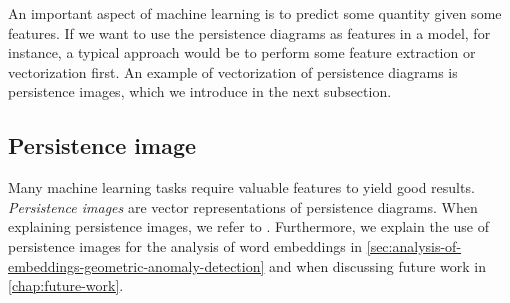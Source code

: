An important aspect of machine learning is to predict some quantity given some features. If we want to use the persistence diagrams as features in a model, for instance, a typical approach would be to perform some feature extraction or vectorization first. An example of vectorization of persistence diagrams is persistence images, which we introduce in the next subsection.

\subsection{Persistence image}
\label{sec:persistence-image}
Many machine learning tasks require valuable features to yield good results. \textit{Persistence images} \cite{adams2016persistence} are vector representations of persistence diagrams. When explaining persistence images, we refer to \cite{adams2016persistence}. Furthermore, we explain the use of persistence images for the analysis of word embeddings in \cref{sec:analysis-of-embeddings-geometric-anomaly-detection} and when discussing future work in \cref{chap:future-work}.

